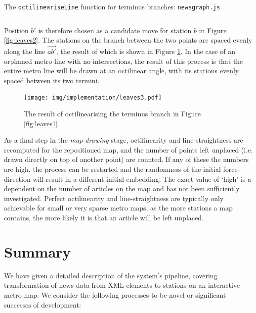 \begin{listing}[htbp!]
\caption{The \texttt{octilineariseLine} function for terminus branches: \texttt{newsgraph.js}}
\label{list:octilinearise}
\inputminted[fontsize=\footnotesize,linenos,numbersep=5pt,firstline=328, lastline=349]{js}{../src/webUtils/newsgraph.js}
\end{listing}
 
Position $b'$ is therefore chosen as a candidate move for station $b$ in Figure \ref{fig:leaves2}. The stations on the branch between the two points are spaced evenly along the line $\overrightarrow{ab'}$, the result of which is shown in Figure \ref{fig:leaves3}.  In the case of an orphaned metro line with no intersections, the result of this process is that the entire metro line will be drawn at an octilinear angle, with its stations evenly spaced between its two termini.

\begin{figure}[htbp!]
	\centering
	\texttt{[image: img/implementation/leaves3.pdf]}
	\caption{The result of octilinearising the terminus branch in Figure \ref{fig:leaves1}}
	\label{fig:leaves3}
\end{figure}

As a final step in the \textit{map drawing} stage, octilinearity and line-straightness are recomputed for the repositioned map, and the number of points left unplaced (i.e. drawn directly on top of another point) are counted. If any of these the numbers are high, the process can be restarted and the randomness of the initial force-direction will result in a different initial embedding. The exact value of `high' is a dependent on the number of articles on the map and has not been sufficiently investigated. Perfect octilinearity and line-straightness are typically only achievable for small or very sparse metro maps, as the more stations a map contains, the more likely it is that an article will be left unplaced.

\section{Summary}

We have given a detailed description of the system's pipeline, covering transformation of news data from XML elements to stations on an interactive metro map. We consider the following processes to be novel or significant successes of development:

